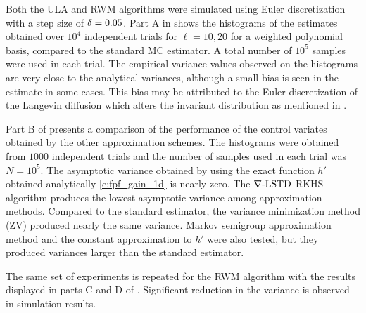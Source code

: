 Both the ULA and RWM algorithms were simulated using Euler discretization with a step size of $\delta = 0.05$. Part A in  shows the histograms of the estimates obtained over $10^4$ independent trials for $\ell= 10,20$ for a weighted polynomial basis, compared to the standard MC estimator. A total number of $10^5$ samples were used in each trial. The empirical variance values observed on the histograms are very close to the analytical variances, although a small bias is seen in the estimate in some cases. This bias may be attributed to the Euler-discretization of the Langevin diffusion which alters the invariant distribution as mentioned in \cite{robtwe96}.  %

Part B of  presents a comparison of the performance of the control variates obtained by the other approximation schemes. The histograms were obtained from $1000$ independent trials and the number of samples used in each trial was $N=10^5$. The asymptotic variance obtained by using the exact function $h'$ obtained analytically \eqref{e:fpf_gain_1d} is nearly zero. The $\nabla\text{-LSTD}$-RKHS algorithm produces the lowest asymptotic variance among approximation methods. Compared to the standard estimator, the variance minimization method (ZV) \cite{papmirgir14} produced nearly the same variance. Markov semigroup approximation method \cite{tagmeh16a} and the constant approximation to $h'$ were also tested, but they produced variances larger than the standard estimator.

The same set of experiments is repeated for the RWM algorithm with the results displayed in parts C and D of . Significant reduction in the variance is observed in simulation results. %

